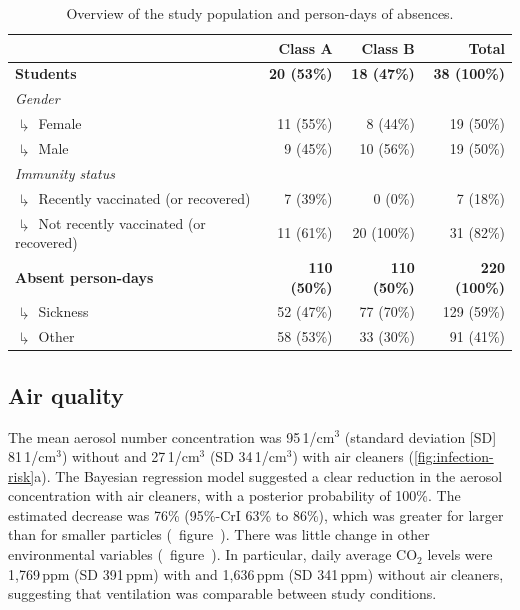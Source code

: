 \documentclass[fleqn,11pt]{wlscirep}
\begin{document}
\begin{table}[!htpb]
    \centering
    \caption{Overview of the study population and person-days of absences.}
    \label{tab:cases-overview-school}
    \footnotesize
    \renewcommand{\arraystretch}{1.5}
    \begin{tabular}{l r r r}
    \toprule
         &  Class A & Class B & Total \\ \midrule 
        \textbf{Students} & \textbf{20 (53\%)} & \textbf{18 (47\%)} & \textbf{38 (100\%)} \\
        \emph{Gender} \\
        $\drsh$ Female & 11 (55\%) & 8 (44\%) & 19 (\hphantom{0}50\%) \\
        $\drsh$ Male & 9 (45\%) & 10 (56\%) & 19 (\hphantom{0}50\%) \\
        \emph{Immunity status} \\
        $\drsh$ Recently vaccinated (or recovered) & 7 (39\%) & 0 (0\%) & 7 (\hphantom{0}18\%) \\
        $\drsh$ Not recently vaccinated (or recovered) & 11 (61\%) & 20 (100\%) & 31 (\hphantom{0}82\%) \\
        \textbf{Absent person-days} & \textbf{110 (50\%)} & \textbf{110 (50\%)} & \textbf{220 (100\%)} \\
        $\drsh$ Sickness & 52 (47\%) & 77 (70\%) & 129 (\hphantom{0}59\%) \\
        $\drsh$ Other & 58 (53\%) & 33 (30\%) & 91 (\hphantom{0}41\%) \\
        \bottomrule
    \end{tabular} 
\end{table}

\subsection*{Air quality}

The mean aerosol number concentration was 95\,1/cm$^3$ (standard deviation [SD] 81\,1/cm$^3$) without and 27\,1/cm$^3$ (SD 34\,1/cm$^3$) with air cleaners (\cref{fig:infection-risk}a). The Bayesian regression model suggested a clear reduction in the aerosol concentration with air cleaners, with a posterior probability of 100\%. The estimated decrease was 76\% (95\%-CrI 63\% to 86\%), which was greater for larger than for smaller particles (\supp~figure~). There was little change in other environmental variables (\supp~figure~). In particular, daily average CO$_2$ levels were 1,769\,ppm (SD 391\,ppm) with and 1,636\,ppm (SD 341\,ppm) without air cleaners, suggesting that ventilation was comparable between study conditions.
\end{document}
